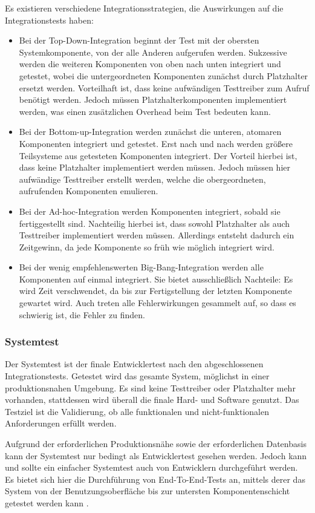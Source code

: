 Es existieren verschiedene Integrationsstrategien, die Auswirkungen auf die Integrationstests haben:\cite[][59\psq]{spillner}
\begin{itemize}
	\item Bei der Top-Down-Integration beginnt der Test mit der obersten Systemkomponente, von der alle Anderen aufgerufen werden. Sukzessive werden die weiteren Komponenten von oben nach unten integriert und getestet, wobei die untergeordneten Komponenten zunächst durch Platzhalter ersetzt werden. Vorteilhaft ist, dass keine aufwändigen Testtreiber zum Aufruf benötigt werden. Jedoch müssen Platzhalterkomponenten implementiert werden, was einen zusätzlichen Overhead beim Test bedeuten kann.
	\item Bei der Bottom-up-Integration werden zunächst die unteren, atomaren Komponenten integriert und getestet. Erst nach und nach werden größere Teilsysteme aus getesteten Komponenten integriert. Der Vorteil hierbei ist, dass keine Platzhalter implementiert werden müssen. Jedoch müssen hier aufwändige Testtreiber erstellt werden, welche die obergeordneten, aufrufenden Komponenten emulieren.
	\item Bei der Ad-hoc-Integration werden Komponenten integriert, sobald sie fertiggestellt sind. Nachteilig hierbei ist, dass sowohl Platzhalter als auch Testtreiber implementiert werden müssen. Allerdings entsteht dadurch ein Zeitgewinn, da jede Komponente so früh wie möglich integriert wird.
	\item Bei der wenig empfehlenswerten Big-Bang-Integration werden alle Komponenten auf einmal integriert. Sie bietet ausschließlich Nachteile: Es wird Zeit verschwendet, da bis zur Fertigstellung der letzten Komponente gewartet wird. Auch treten alle Fehlerwirkungen gesammelt auf, so dass es schwierig ist, die Fehler zu finden.
\end{itemize}

\subsubsection{Systemtest}
Der Systemtest ist der finale Entwicklertest nach den abgeschlossenen Integrationstests. Getestet wird das gesamte System, möglichst in einer produktionsnahen Umgebung. Es sind keine Testtreiber oder Platzhalter mehr vorhanden, stattdessen wird überall die finale Hard- und Software genutzt. Das Testziel ist die Validierung, ob alle funktionalen und nicht-funktionalen Anforderungen erfüllt werden.\cite[][60\psqq]{spillner}

Aufgrund der erforderlichen Produktionsnähe sowie der erforderlichen Datenbasis kann der Systemtest nur bedingt als Entwicklertest gesehen werden\cites[236]{roitzsch}[]{oose}. Jedoch kann und sollte ein einfacher Systemtest auch von Entwicklern durchgeführt werden. Es bietet sich hier die Durchführung von End-To-End-Tests an, mittels derer das System von der Benutzungsoberfläche bis zur untersten Komponentenschicht getestet werden kann \cite{softwaresanierung}.